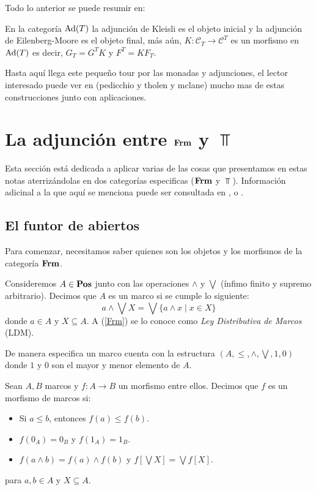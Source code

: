 \documentclass{comunicaciones}
\begin{document}
Todo lo anterior se puede resumir en:

\begin{prop}\label{finaleinicial}
En la categoría  ${\rm Ad}(T)$ la adjunción de Kleisli es el objeto inicial y la adjunción de Eilenberg-Moore es el objeto final,
más aún, $K\colon\mathcal{C}_{T}\rightarrow\mathcal{C}^{T}$ es un morfismo en ${\rm Ad}(T)$ es decir,   $G_{T}=G^{T}K$ y $F^{T}=KF_{T}$.
\end{prop}

Hasta aquí llega este pequeño tour por las monadas y adjunciones, el lector interesado puede ver en (pedicchio y tholen y mclane) mucho mas de estas construcciones junto con aplicaciones.

\section{La adjunción entre $\mathbf{Frm}$ y $\Top$}\label{FrmyTop}

Esta sección está dedicada a aplicar varias de las cosas que presentamos en estas notas aterrizándolas en dos categorías especificas ($\mathbf{Frm}$ y $\Top$). Información adicinal a la que aquí se menciona puede ser consultada en \cite{P.T.}, \cite{J.P.} o \cite{A.Z.}.

\subsection{El funtor de abiertos}
Para comenzar, necesitamos saber quienes son los objetos y los morfismos de la categoría $\mathbf{Frm}$.

\begin{dfn}\label{Marco}
Consideremos $A\in \mathbf{Pos}$ junto con las operaciones $\wedge$ y $\bigvee$ (ínfimo finito y supremo arbitrario). Decimos que $A$ es un marco si se cumple lo siguiente: 
\begin{equation}\label{Frm}
a\wedge\bigvee X=\bigvee\{a\wedge x\mid x\in X\}
\end{equation}
donde $a\in A$ y $X\subseteq A$. A (\ref{Frm}) se lo conoce como \emph{Ley Distributiva de Marcos} (LDM).  
\end{dfn}
De manera especifica un marco cuenta con la estructura $(A, \leq, \wedge, \bigvee, 1, 0)$ donde $1$ y $0$ son el mayor y menor elemento de $A$. 

\begin{dfn}\label{Morfismodemarcos}
Sean $A, B$ marcos y $f\colon A\to B$ un morfismo entre ellos. Decimos que $f$ es un morfismo de marcos si:
\begin{itemize}
    \item Si $a\leq b$, entonces $f(a)\leq f(b)$.
    \item $f(0_A)=0_B$ y $f(1_A)=1_B$.
    \item $f(a\wedge b)=f(a)\wedge f(b)$ y $f[\bigvee X]=\bigvee f[X]$.
\end{itemize}
para $a,b\in A$ y $X\subseteq A$.
\end{dfn}
\end{document}
